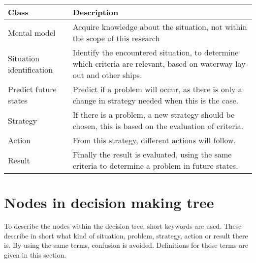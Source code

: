 \begin{table}[H]
	\begin{tabular}{p{}|p{}}
		\toprule
		Class & Description\\
		\midrule
		Mental model & Acquire knowledge about the situation, not within the scope of this research \\
		Situation identification & Identify the encountered situation, to determine which criteria are relevant, based on waterway lay-out and other ships. \\
		Predict future states & Predict if a problem will occur, as there is only a change in strategy needed when this is the case. \\
		Strategy & If there is a problem, a new strategy should be chosen, this is based on the evaluation of criteria. \\
		Action & From this strategy, different actions will follow. \\
		Result & Finally the result is evaluated, using the same criteria to determine a problem in future states. \\
		\bottomrule
	\end{tabular}
	
	\label{tab:phases-description}
\end{table}

\section{Nodes in decision making tree}
To describe the nodes within the decision tree, short keywords are used. These describe in short what kind of situation, problem, strategy, action or result there is. By using the same terms, confusion is avoided. Definitions for those terms are given in this section.

